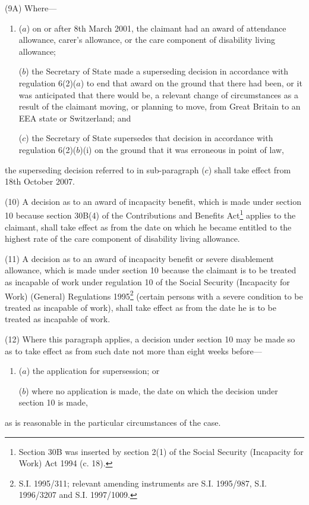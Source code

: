 \documentclass[12pt,a4paper]{article}
\begin{document}
(9A) Where—
\begin{enumerate}\item[]
($a$) on or after 8th March 2001, the claimant had an award of attendance allowance, carer’s allowance, or the care component of disability living allowance;

($b$) the Secretary of State made a superseding decision in accordance with regulation 6(2)($a$) to end that award on the ground that there had been, or it was anticipated that there would be, a relevant change of circumstances as a result of the claimant moving, or planning to move, from Great Britain to an EEA state or Switzerland; and

($c$) the Secretary of State supersedes that decision in accordance with regulation 6(2)($b$)(i) on the ground that it was erroneous in point of law,
\end{enumerate}
the superseding decision referred to in sub-paragraph ($c$) shall take effect from 18th October 2007.

(10) A decision as to an award of incapacity benefit, which is made under section 10 because section 30B(4) of the Contributions and Benefits Act\footnote{\frenchspacing Section 30B was inserted by section 2(1) of the Social Security (Incapacity for Work) Act 1994 (c. 18).} applies to the claimant, shall take effect as from the date on which he became entitled to the highest rate of the care component of disability living allowance.

(11) A decision as to an award of incapacity benefit or severe disablement allowance, which is made under section 10 because the claimant is to be treated as incapable of work under regulation 10 of the Social Security (Incapacity for Work) (General) Regulations 1995\footnote{\frenchspacing S.I. 1995/311; relevant amending instruments are S.I. 1995/987, S.I. 1996/3207 and S.I. 1997/1009.} (certain persons with a severe condition to be treated as incapable of work), shall take effect as from the date he is to be treated as incapable of work.

(12) Where this paragraph applies, a decision under section 10 may be made so as to take effect as from such date not more than eight weeks before—
\begin{enumerate}\item[]
($a$) the application for supersession; or

($b$) where no application is made, the date on which the decision under section 10 is made,
\end{enumerate}
as is reasonable in the particular circumstances of the case.
\end{document}
